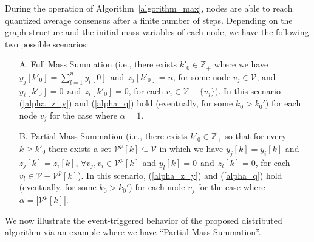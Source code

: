 \documentclass[twocolumn]{autart}    %
\let\mathbb=\mathds %
\begin{document}
During the operation of Algorithm~\ref{algorithm_max}, nodes are able to reach quantized average consensus after a finite number of steps. 
Depending on the graph structure and the initial mass variables of each node, we have the following two possible scenarios:
\begin{enumerate}
\item[A.] Full Mass Summation (i.e., there exists $k'_0 \in \mathbb{Z}_+$ where we have $y_j[k'_0] =\sum_{l=1}^{n}{y_l[0]}  \ \ \text{and} \ \ z_j[k'_0] = n$, for some node $v_j \in \mathcal{V}$, and $y_i[k'_0] = 0  \ \ \text{and} \ \ z_i[k'_0] = 0$, for each $ v_i \in \mathcal{V} - \{ v_j \}$). 
In this scenario (\ref{alpha_z_y}) and (\ref{alpha_q}) hold (eventually, for some $k_0 > k_0'$) for each node $v_j$ for the case where $\alpha = 1$. 
\item[B.] Partial Mass Summation (i.e., there exists $k'_0 \in \mathbb{Z}_+$ so that for every $k \geq k'_0$ there exists a set $\mathcal{V}^p[k] \subseteq \mathcal{V}$ in which we have $y_j[k] = y_i[k]$ and $z_j[k] = z_i[k]$, $\forall v_j, v_i \in \mathcal{V}^p[k]$ and $y_l[k] = 0  \ \ \text{and} \ \ z_l[k] = 0$, for each $ v_l \in \mathcal{V} - \mathcal{V}^p[k]$). 
In this scenario, (\ref{alpha_z_y}) and (\ref{alpha_q}) hold (eventually, for some $k_0 > k_0'$) for each node $v_j$ for the case where $\alpha = | \mathcal{V}^p[k] |$.
\end{enumerate}


We now illustrate the event-triggered behavior of the proposed distributed algorithm via an example where we have ``Partial Mass Summation''. 
\end{document}
